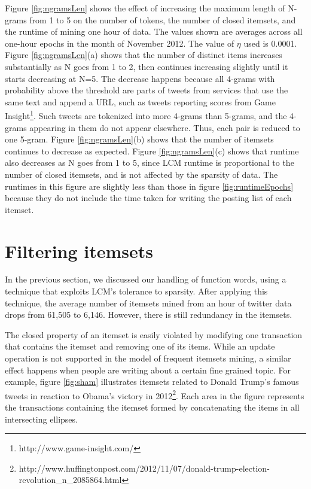 \documentclass[letterpaper,12pt,titlepage,oneside,final]{book}
\begin{document}
Figure \ref{fig:ngramsLen} shows the effect of increasing the maximum length
of N-grams from 1 to 5 on the number of tokens, the number of closed itemsets,
and the runtime of mining one hour of data.
The values shown are averages across all one-hour epochs in the month of
November 2012.
The value of $\eta$ used is 0.0001.
Figure \ref{fig:ngramsLen}(a) shows that the number of distinct items
increases substantially as N goes from 1 to 2, then continues increasing
slightly until it starts decreasing at N=5.
The decrease happens because all 4-grams with probability above the threshold
are parts of tweets from services that use the same text and append a URL,
such as tweets reporting scores from
Game Insight\footnote{http://www.game-insight.com/}.
Such tweets are tokenized into more 4-grams than 5-grams, and the 4-grams
appearing in them do not appear elsewhere.
Thus, each pair is reduced to one 5-gram.
Figure \ref{fig:ngramsLen}(b) shows that the number of itemsets continues to
decrease as expected.
Figure \ref{fig:ngramsLen}(c) shows that runtime also decreases as N goes
from 1 to 5, since LCM runtime is proportional to the number of closed
itemsets, and is not affected by the sparsity of data.
The runtimes in this figure are slightly less than those in
figure \ref{fig:runtimeEpochs} because they do not include the time taken for
writing the posting list of each itemset.





\section{Filtering itemsets}
\label{sec:strong}



In the previous section, we discussed our handling of function words,
using a technique that exploits LCM's tolerance to sparsity.
After applying this technique, the average number of itemsets mined from an
hour of twitter data drops from 61,505 to 6,146.
However, there is still redundancy in the itemsets.

The closed property of an itemset is easily violated by modifying one
transaction that contains the itemset and removing one of its items.
While an update operation is not supported in the model of frequent itemsets
mining, a similar effect happens when people are writing about a certain fine
grained topic.
For example, figure \ref{fig:sham} illustrates  itemsets related to Donald
Trump's famous tweets in reaction to Obama's victory in
2012\footnote{http://www.huffingtonpost.com/2012/11/07/donald-trump-election-revolution\_n\_2085864.html}.  
Each area in the figure represents the transactions containing the itemset
formed by concatenating the items in all intersecting ellipses.  
\end{document}
